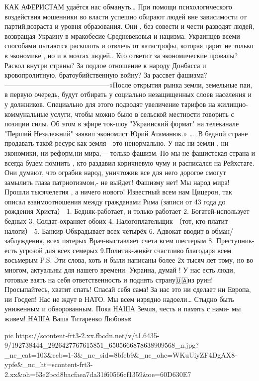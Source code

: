 КАК АФЕРИСТАМ 
удаётся нас обмануть…
При помощи психологического воздействия мошенники во власти успешно обирают людей  вне зависимости от  партий,возраста и уровня образования.
 Они , без совести и чести разводят  людей, возвращая Украину в мракобесие  
Средневековья и нацизма.
Украинцев всеми способами пытаются  расколоть и отвлечь 
от катастрофы, которая царит не только в экономике , но и в мозгах людей..
 Кто ответит за экономические провалы? 
Раскол внутри страны?
За подлое отношение к народу Донбасса и кровопролитную, братоубийственную войну?
За рассвет  фашизма? 
———————————————«После открытия рынка земли, земельные паи, в первую очередь, будут отбирать у социально незащищенных слоев населения и у должников. Специально для этого подводят увеличение тарифов на жилищно-коммунальные услуги, чтобы можно было в сельской местности говорить с позиции силы.
Об этом в эфире ток-шоу "Украинский формат" на телеканале "Перший Незалежний" заявил экономист Юрий Атаманюк.»
…..В бедной стране продавать такой ресурс как земля - это ненормально.
У нас ни земли , ни экономики,  ни реформ,ни мира,—
только фашизм. 
Но мы не фашистская страна и всегда будем помнить , кто раздавил коричневую чуму  и расписался на Рейхстаге.  
Они думают, что ограбив народ, уничтожив все для него дорогое  смогут замылить  глаза патриотизмом,- не выйдет! Фашизму нет! 
Мы народ мира!
 Прошли тысячелетия , 
а ничего нового!
Известный всем нам Цицерон, так описал взаимоотношения между гражданами Рима (записи от 43 года до рождения Христа）
1. Бедняк-работает, и только работает
2. Богатей-использует бедных
3. Солдат-охраняет обоих
4. Налогоплательщик （тот, кто платит налоги）
5. Банкир-Обкрадывает всех четырёх
6. Адвокат-вводит в обман/заблуждения, всех пятерых
Врач-выставляет счета всем шестерым
8. Преступник-есть угрозой для всех семерых
9.Политик-живёт счастливо благодаря всем восьмерым
P.S. Эти слова, хоть и были написаны  более 2х тысяч лет тому, но во многом, актуальны для нашего времени.
Украина, думай ! У нас есть люди, готовые взять на себя ответственность и поднять страну🇺🇦из руин! Просыпайтесь, хватит спать! Спасай себя сама! За нас это ни сделает ни Европа, ни Госдеп! Нас не ждут в НАТО.
Мы всем изрядно надоели…
Стыдно быть униженным и обворованным. 
 Пока НАША  Земля,
честь и память с нами- 
мы живем! НАША Ваша Титаренко Любовь✊


\ifcmt
  pic https://scontent-frt3-2.xx.fbcdn.net/v/t1.6435-9/192738444_2926427767615851_6505666878638909568_n.jpg?_nc_cat=103&ccb=1-3&_nc_sid=8bfeb9&_nc_ohc=WKuUiyZF4DgAX8-ypfe&_nc_ht=scontent-frt3-2.xx&oh=63e2bcd8bacfaea7da31f60566cf1359&oe=60D630E7

